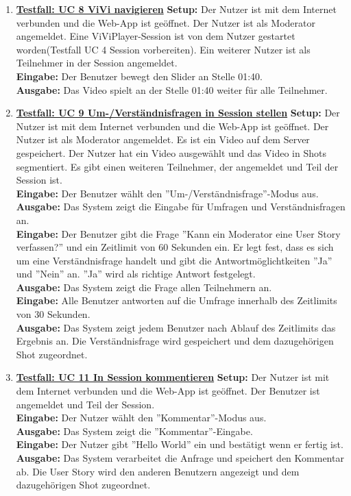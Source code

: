 \begin{enumerate}
	\item \underline{\textbf{Testfall: UC 8 ViVi navigieren}} \linebreak
	\textbf{Setup:} Der Nutzer ist mit dem Internet verbunden und die Web-App ist geöffnet. Der Nutzer ist als Moderator angemeldet. Eine ViViPlayer-Session ist von dem Nutzer gestartet worden(Testfall UC 4 Session vorbereiten). Ein weiterer Nutzer ist als Teilnehmer in der Session angemeldet. \\
	\textbf{Eingabe:} Der Benutzer bewegt den Slider an Stelle 01:40. \\
	\textbf{Ausgabe:} Das Video spielt an der Stelle 01:40 weiter für alle Teilnehmer.\\
	
	\item \underline{\textbf{Testfall: UC 9 Um-/Verständnisfragen in Session stellen}} \linebreak
	\textbf{Setup:} Der Nutzer ist mit dem Internet verbunden und die Web-App ist geöffnet. Der Nutzer ist als Moderator angemeldet. Es ist ein Video auf dem Server gespeichert. Der Nutzer hat ein Video ausgewählt und das Video in Shots segmentiert. Es gibt einen weiteren Teilnehmer, der angemeldet und Teil der Session ist.\\
	\textbf{Eingabe:} Der Benutzer wählt den ''Um-/Verständnisfrage''-Modus aus. \\
	\textbf{Ausgabe:} Das System zeigt die Eingabe für Umfragen und Verständnisfragen an.\\ 
	\textbf{Eingabe:} Der Benutzer gibt die Frage ''Kann ein Moderator eine User Story verfassen?'' und ein Zeitlimit von 60 Sekunden ein. Er legt fest, dass es sich um eine Verständnisfrage handelt und gibt die Antwortmöglichtkeiten ''Ja'' und ''Nein'' an. ''Ja'' wird als richtige Antwort festgelegt.\\
	\textbf{Ausgabe:} Das System zeigt die Frage allen Teilnehmern an.\\ 
	\textbf{Eingabe:} Alle Benutzer antworten auf die Umfrage innerhalb des Zeitlimits von 30 Sekunden.\\
	\textbf{Ausgabe:} Das System zeigt jedem Benutzer nach Ablauf des Zeitlimits das Ergebnis an. Die Verständnisfrage wird gespeichert und dem dazugehörigen Shot zugeordnet.\\
	
	\item \underline{\textbf{Testfall: UC 11 In Session kommentieren}} \linebreak
	\textbf{Setup:} Der Nutzer ist mit dem Internet verbunden und die Web-App ist geöffnet. Der Benutzer ist angemeldet und Teil der Session.\\
	\textbf{Eingabe:} Der Nutzer wählt den ''Kommentar''-Modus aus. \\
	\textbf{Ausgabe:} Das System zeigt die ''Kommentar''-Eingabe. \\
	\textbf{Eingabe:} Der Nutzer gibt ''Hello World'' ein und bestätigt wenn er fertig ist.\\
	\textbf{Ausgabe:} Das System verarbeitet die Anfrage und speichert den Kommentar ab. Die User Story wird den anderen Benutzern angezeigt und dem dazugehörigen Shot zugeordnet. \\
	

\end{enumerate}
